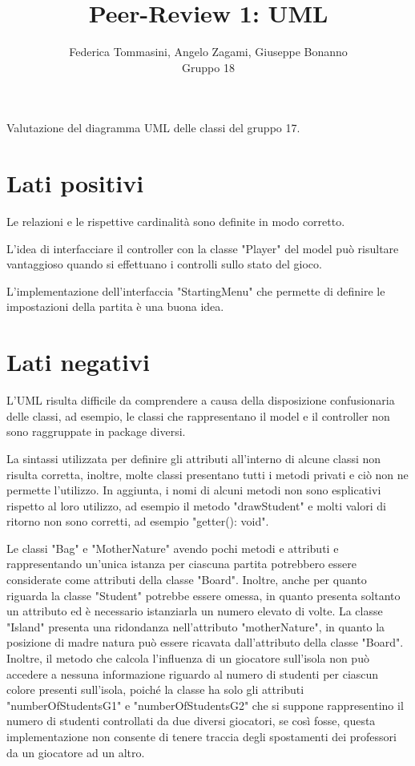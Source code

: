 \documentclass[12pt]{article}
\title{Peer-Review 1: UML}
\author{Federica Tommasini, Angelo Zagami, Giuseppe Bonanno\\Gruppo 18}
\begin{document}
\maketitle

Valutazione del diagramma UML delle classi del gruppo 17.

\section{Lati positivi}

Le relazioni e le rispettive cardinalità sono definite in modo corretto.

L'idea di interfacciare il controller con la classe "Player" del model può risultare vantaggioso quando si effettuano i controlli sullo stato del gioco. 

L'implementazione dell'interfaccia "StartingMenu" che permette di definire le impostazioni della partita è una buona idea.



\section{Lati negativi}
L'UML risulta difficile da comprendere a causa della disposizione confusionaria delle classi, ad esempio, le classi che rappresentano il model e il controller non sono raggruppate in package diversi. 

La sintassi utilizzata per definire gli attributi all'interno di alcune classi non risulta corretta, inoltre, molte classi presentano tutti i metodi privati e ciò non ne permette l'utilizzo. In aggiunta, i nomi di alcuni metodi non sono esplicativi rispetto al loro utilizzo, ad esempio il metodo "drawStudent" e molti valori di ritorno non sono corretti, ad esempio "getter(): void".

Le classi "Bag" e "MotherNature" avendo pochi metodi e attributi e rappresentando un'unica istanza per ciascuna partita potrebbero essere considerate come attributi della classe "Board". Inoltre, anche per quanto riguarda la classe "Student" potrebbe essere omessa, in quanto presenta soltanto un attributo ed è necessario istanziarla un numero elevato di volte.
La classe "Island" presenta una ridondanza nell'attributo "motherNature", in quanto la posizione di madre natura può essere ricavata dall'attributo della classe "Board". Inoltre, il metodo che calcola l'influenza di un giocatore sull'isola non può accedere a nessuna informazione riguardo al numero di studenti per ciascun colore presenti sull'isola, poiché la classe ha solo gli attributi "numberOfStudentsG1" e "numberOfStudentsG2" che si suppone rappresentino il numero di studenti controllati da due diversi giocatori, se così fosse, questa implementazione non consente di tenere traccia degli spostamenti dei professori da un giocatore ad un altro.
\end{document}
